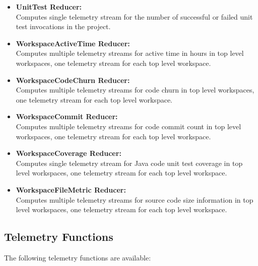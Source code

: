 \begin{itemize}
	\item \textbf{UnitTest Reducer:}\\
Computes single telemetry stream for the number of successful or failed unit test invocations in the project.

	\item \textbf{WorkspaceActiveTime Reducer:}\\
Computes multiple telemetry streams for active time in hours in top level workspaces, one telemetry stream for each top level workspace.

	\item \textbf{WorkspaceCodeChurn Reducer:}\\
Computes multiple telemetry streams for code churn in top level workspaces, one telemetry stream for each top level workspace.

	\item \textbf{WorkspaceCommit Reducer:}\\
Computes multiple telemetry streams for code commit count in top level workspaces, one telemetry stream for each top level workspace.

	\item \textbf{WorkspaceCoverage Reducer:}\\
Computes single telemetry stream for Java code unit test coverage in top level workspaces, one telemetry stream for each top level workspace.

	\item \textbf{WorkspaceFileMetric Reducer:}\\
Computes multiple telemetry streams for source code size information in top level workspaces, one telemetry stream for each top level workspace.

\end{itemize}








\subsection{Telemetry Functions} \label{Implementation:Functions}

The following telemetry functions are available:

